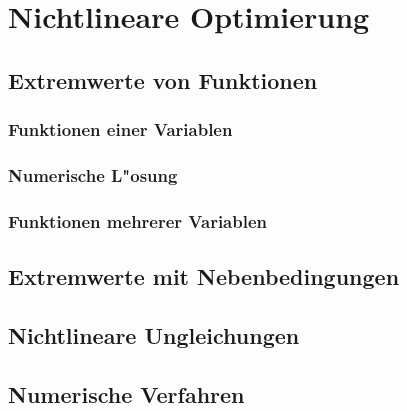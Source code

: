 \chapter{Nichtlineare Optimierung\label{chapter-nichtlineare-optimierung}}
\section{Extremwerte von Funktionen}
\subsection{Funktionen einer Variablen}
\subsection{Numerische L"osung}
\subsection{Funktionen mehrerer Variablen}
\section{Extremwerte mit Nebenbedingungen}
\section{Nichtlineare Ungleichungen}
\section{Numerische Verfahren}
